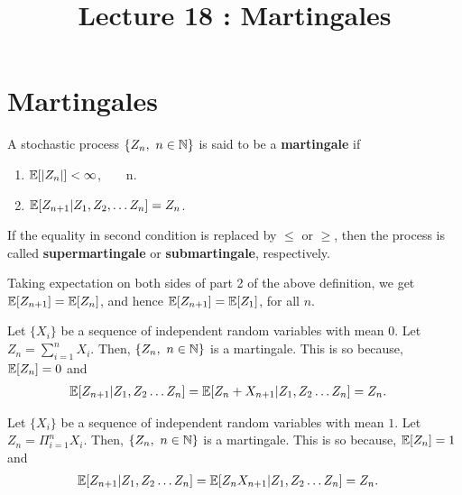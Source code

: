 \documentclass[a4paper,10pt,english]{article}
\title{Lecture 18 : Martingales}
\author{}
\begin{document}
\maketitle
\section{Martingales}
\begin{defn}
A stochastic process $\{Z_n,~n \in \mathbb{N} \}$ is said to be a \textbf{martingale} if 
\begin{enumerate}
\item $\mathbb{E}[|Z_n|]< \infty$, ~ ~ n.
\item $\mathbb{E}[Z_{n+1}|Z_1,Z_2, \hdots Z_n]=Z_n$.
\end{enumerate}
If the equality in second condition is replaced by $\leq$ or $\geq$, then the process is called \textbf{supermartingale} or \textbf{submartingale}, respectively.
\end{defn}
\begin{rem} Taking expectation on both sides of part 2 of the above definition, we get $\mathbb{E}[Z_{n+1}]=\mathbb{E}[Z_n]$, and hence $\mathbb{E}[Z_{n+1}]=\mathbb{E}[Z_1]$, for all $n$.
\end{rem}
\begin{exmp}
Let $\{X_i\}$ be a sequence of independent random variables with mean $0$. Let $Z_n=\sum_{i=1}^n X_i$. Then, $\{Z_n,~n \in \mathbb{N} \}$ is a martingale. This is so because, $\mathbb{E}[Z_n]=0$ and 
\begin{align*}
\mathbb{E}[Z_{n+1}|Z_1,Z_2 \hdots Z_n] =\mathbb{E}[Z_{n}+X_{n+1}|Z_1,Z_2 \hdots Z_n]
&=Z_n.
\end{align*} 
\end{exmp}
\begin{exmp}
Let $\{X_i\}$ be a sequence of independent random variables with mean $1$. Let $Z_n=\Pi_{i=1}^n X_i$. Then, $\{Z_n,~n \in \mathbb{N} \}$ is a martingale. This is so because, $\mathbb{E}[Z_n]=1$ and 
\begin{align*}
\mathbb{E}[Z_{n+1}|Z_1,Z_2 \hdots Z_n] =\mathbb{E}[Z_{n}X_{n+1}|Z_1,Z_2 \hdots Z_n]
&=Z_n.
\end{align*} 
\end{exmp}
\end{document}
